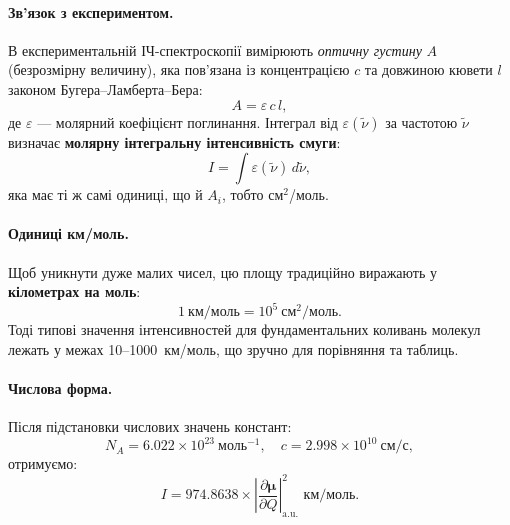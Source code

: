 \paragraph{Зв’язок з експериментом.}
В експериментальній ІЧ-спектроскопії вимірюють \emph{оптичну густину} $A$ (безрозмірну величину),
яка пов’язана із концентрацією $c$ та довжиною кювети $l$ законом Бугера–Ламберта–Бера:
\begin{equation*}
    A = \varepsilon\, c\, l,
\end{equation*}
де $\varepsilon$ --- молярний коефіцієнт поглинання.
Інтеграл від $\varepsilon(\tilde{\nu})$ за частотою $\tilde{\nu}$ визначає \textbf{молярну інтегральну інтенсивність смуги}:
\begin{equation*}
    I = \int \varepsilon(\tilde{\nu})\, d\tilde{\nu},
\end{equation*}
яка має ті ж самі одиниці, що й $A_i$, тобто см$^2$/моль.

\paragraph{Одиниці км/моль.}
Щоб уникнути дуже малих чисел, цю площу традиційно виражають у \textbf{кілометрах на моль}:
\begin{equation*}
    1~\text{км/моль} = 10^5~\text{см}^2/\text{моль}.
\end{equation*}
Тоді типові значення інтенсивностей для фундаментальних коливань молекул
лежать у межах 10–1000~км/моль, що зручно для порівняння та таблиць.

\paragraph{Числова форма.}
Після підстановки числових значень констант:
\begin{equation*}
    N_A = 6.022 \times 10^{23}~\text{моль}^{-1}, \quad
    c = 2.998 \times 10^{10}~\text{см/с},
\end{equation*}
отримуємо:
\begin{equation*}
    \boxed{I = 974.8638 \times
    \left| \frac{\partial \boldsymbol{\mu}}{\partial Q} \right|^2_{\text{a.u.}} \text{ км/моль}.}
\end{equation*}

